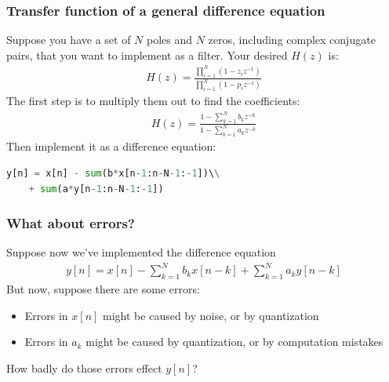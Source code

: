 \documentclass{beamer}
\begin{document}
\begin{frame}[fragile]
  \frametitle{Transfer function of a general difference equation}

  Suppose you have a set of $N$ poles and $N$ zeros, including complex
  conjugate pairs, that you want to implement as a filter.  Your
  desired $H(z)$ is:
  \begin{align*}
    H(z) = \frac{\prod_{i=1}^N (1-z_iz^{-1})}{\prod_{i=1}^N (1-p_iz^{-1})}
  \end{align*}
  The first step is to multiply them out to find the coefficients:
  \begin{align*}
    H(z) = \frac{1-\sum_{k=1}^Nb_kz^{-k}}{1-\sum_{k=1}^N a_k z^{-k}}
  \end{align*}
  Then implement it as a difference equation:
  \begin{lstlisting}[language=Python]
    y[n] = x[n] - sum(b*x[n-1:n-N-1:-1])\\
    + sum(a*y[n-1:n-N-1:-1])
  \end{lstlisting}
\end{frame}

\begin{frame}
  \frametitle{What about errors?}

  Suppose now we've implemented the difference equation
  \begin{align*}
    y[n] = x[n]-\sum_{k=1}^Nb_kx[n-k]+\sum_{k=1}^Na_k y[n-k]
  \end{align*}
  But now, suppose there are some errors:
  \begin{itemize}
  \item Errors in $x[n]$ might be caused by noise, or by quantization
  \item Errors in $a_k$ might be caused by quantization, or by computation mistakes
  \end{itemize}
  How badly do those errors effect $y[n]$?
\end{frame}
  
\end{document}
